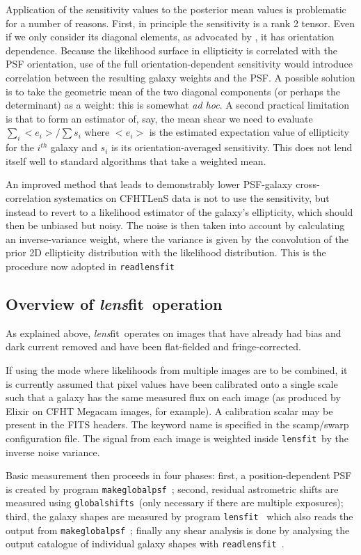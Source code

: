 \documentclass{article}
\def\lensfit{{\tt lensfit}\ }
\def\globalshifts{{\tt globalshifts}\ }
\def\makeglobalpsf{{\tt makeglobalpsf}\ }
\def\lensfitsuite{{\em lens}fit\ }
\def\readlensfit{{\tt readlensfit}\ }
\begin{document}
Application of the sensitivity values to the posterior mean values is problematic for a 
number of reasons.  First, in principle the sensitivity is a rank 2 tensor.  Even if we only consider its
diagonal elements, as advocated by \citet{miller07a}, it has orientation dependence.  Because the likelihood
surface in ellipticity is correlated with the PSF orientation, use of the full orientation-dependent
sensitivity would introduce correlation between the resulting galaxy weights and the PSF.  A possible
solution is to take the geometric mean of the two diagonal components (or perhaps the determinant) as
a weight: this is somewhat {\em ad hoc}.  A second practical limitation is that to form an estimator of,
say, the mean shear we need to evaluate $\sum_i <e_i>/\sum s_i$ where $<e_i>$ is the estimated expectation
value of ellipticity for the $i^{th}$ galaxy and $s_i$ is its orientation-averaged sensitivity.  This does
not lend itself well to standard algorithms that take a weighted mean.

An improved method that leads to demonstrably lower PSF-galaxy cross-correlation systematics on CFHTLenS
data is not to use the sensitivity, but instead to revert to a likelihood estimator of the galaxy's ellipticity,
which should then be unbiased but noisy.  The noise is then taken into account by calculating an inverse-variance
weight, where the variance is given by the convolution of the prior 2D ellipticity distribution with the likelihood 
distribution.  This is the procedure now adopted in \readlensfit

\subsection{Overview of \lensfitsuite operation}
As explained above, \lensfitsuite operates on images that have already had bias and dark current removed and 
have been flat-fielded and fringe-corrected. 

If using the mode where likelihoods from multiple images are to be combined, it is currently assumed that 
pixel values have been calibrated onto a single scale such that a galaxy has the same measured flux on each 
image (as produced by Elixir on CFHT Megacam images, for example). A calibration scalar may be present 
in the FITS headers. The keyword name is specified in the scamp/swarp configuration file. The signal 
from each image is weighted inside \lensfit by the inverse noise variance. 

Basic measurement then proceeds in four phases: first, a position-dependent PSF is created by 
program \makeglobalpsf; 
second, residual astrometric shifts are measured using \globalshifts (only necessary if there are multiple
exposures);
third, the galaxy shapes are measured by program \lensfit 
which also reads the output from \makeglobalpsf; finally any shear analysis is done by 
analysing the output catalogue of individual galaxy shapes with \readlensfit . 
\end{document}
